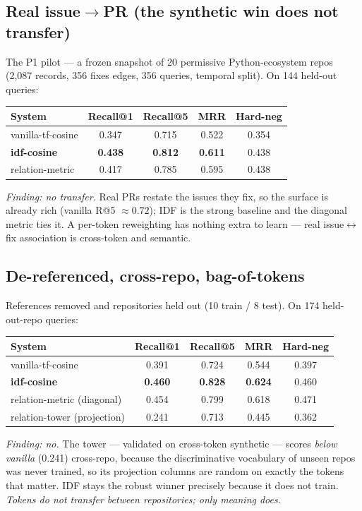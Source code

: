 \documentclass[11pt]{article}
\newcommand{\rel}[1]{\textsf{#1}}
\begin{document}
\subsection{Real issue$\to$PR (the synthetic win does not transfer)}

The P1 pilot --- a frozen snapshot of 20 permissive Python-ecosystem repos
(2{,}087 records, 356 \rel{fixes} edges, 356 queries, temporal split). On 144
held-out queries:
\begin{center}
\begin{tabular}{lcccc}
\toprule
System & Recall@1 & Recall@5 & MRR & Hard-neg \\
\midrule
vanilla-tf-cosine & 0.347 & 0.715 & 0.522 & 0.354 \\
\textbf{idf-cosine} & \textbf{0.438} & \textbf{0.812} & \textbf{0.611} & 0.438 \\
relation-metric & 0.417 & 0.785 & 0.595 & 0.438 \\
\bottomrule
\end{tabular}
\end{center}
\emph{Finding: no transfer.} Real PRs restate the issues they fix, so the surface is
already rich (vanilla R@5 $\approx 0.72$); IDF is the strong baseline and the diagonal
metric ties it. A per-token reweighting has nothing extra to learn --- real
issue$\leftrightarrow$fix association is cross-token and semantic.

\subsection{De-referenced, cross-repo, bag-of-tokens}

References removed and repositories held out (10 train / 8 test). On 174 held-out-repo
queries:
\begin{center}
\begin{tabular}{lcccc}
\toprule
System & Recall@1 & Recall@5 & MRR & Hard-neg \\
\midrule
vanilla-tf-cosine & 0.391 & 0.724 & 0.544 & 0.397 \\
\textbf{idf-cosine} & \textbf{0.460} & \textbf{0.828} & \textbf{0.624} & 0.460 \\
relation-metric (diagonal) & 0.454 & 0.799 & 0.618 & 0.471 \\
relation-tower (projection) & 0.241 & 0.713 & 0.445 & 0.362 \\
\bottomrule
\end{tabular}
\end{center}
\emph{Finding: no.} The tower --- validated on cross-token synthetic --- scores
\emph{below vanilla} (0.241) cross-repo, because the discriminative vocabulary of
unseen repos was never trained, so its projection columns are random on exactly the
tokens that matter. IDF stays the robust winner precisely because it does not train.
\emph{Tokens do not transfer between repositories; only meaning does.}
\end{document}
